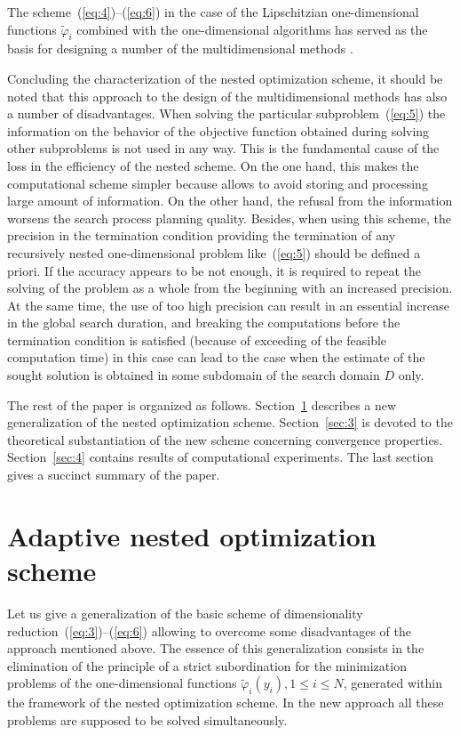 \documentclass[smallextended]{svjour3}
\let\origref\ref
\renewcommand{\ref}[1]{(\origref{#1})}
\begin{document}
The scheme~\ref{eq:4}--\ref{eq:6} in the case of  the Lipschitzian one-dimensional functions $\widetilde{\varphi}_i$ combined with the one-dimensional algorithms \cite{Ref7, Ref25, Ref32, Ref34, Ref35, Ref36} has served as the basis for designing  a number of the multidimensional methods \cite{Ref3, Ref12, Ref25, Ref26, Ref36}.

Concluding the characterization of the nested optimization scheme, it should be noted that this approach to the design of the multidimensional methods has also a number of disadvantages. When solving the particular subproblem~\ref{eq:5} the information on the behavior of the objective function obtained during solving other subproblems is not used in any way. This is the fundamental cause of the loss in the efficiency of the nested scheme. On the one hand, this makes the computational scheme simpler because allows to avoid storing and processing large amount of information. On the other hand, the refusal from the information worsens the search process planning quality.
Besides, when using this scheme, the precision in the termination condition providing the termination of any recursively nested one-dimensional problem like~\ref{eq:5} should be defined a priori. If the accuracy appears to be not enough, it is required to repeat the solving of the problem as a whole from the beginning with an increased precision. At the same time, the use of too high precision can result in an essential increase in the global search duration, and breaking the computations before the termination condition is satisfied (because of exceeding of the feasible computation time) in this case can lead to the case when the estimate of the sought solution is obtained in some subdomain of the search domain $D$ only.

The rest of the paper is organized as follows. Section~\origref{sec:2} describes a new generalization of the nested optimization scheme. Section~\origref{sec:3} is devoted to the theoretical substantiation of the new scheme concerning convergence properties. Section~\origref{sec:4} contains results of computational experiments. The last section gives a succinct summary of the paper.

\section{Adaptive nested optimization  scheme}
\label{sec:2}
Let us give a generalization of the basic scheme of dimensionality reduction~\ref{eq:3}--\ref{eq:6} allowing to overcome some disadvantages of the approach mentioned above. The essence of this generalization consists in the elimination of the principle of a strict subordination for the minimization problems of the one-dimensional functions $\widetilde{\varphi}_i(y_i), 1 \leq i \leq N$, generated within the framework of the nested optimization scheme. In the new approach all these problems are supposed to be solved simultaneously.
\end{document}
